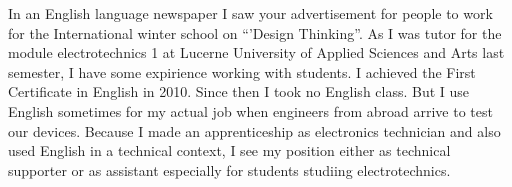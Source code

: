 \documentclass[11pt]{g-brief}
\begin{document}
\begin{g-brief}
In an English language newspaper I saw your advertisement for people to work 
for the International winter school on "`'Design Thinking"'. As I was tutor for 
the module electrotechnics 1 at Lucerne University of Applied Sciences and 
Arts last semester, I have some expirience working with students. I achieved 
the First Certificate in English in 2010. Since then I took no English class. 
But I use English sometimes for my actual job when engineers from abroad 
arrive to test our devices. Because I made an apprenticeship as electronics 
technician and also used English in a technical context, I see my position 
either as technical supporter or as assistant especially for students studiing 
electrotechnics. 

\end{g-brief}
\end{document}
